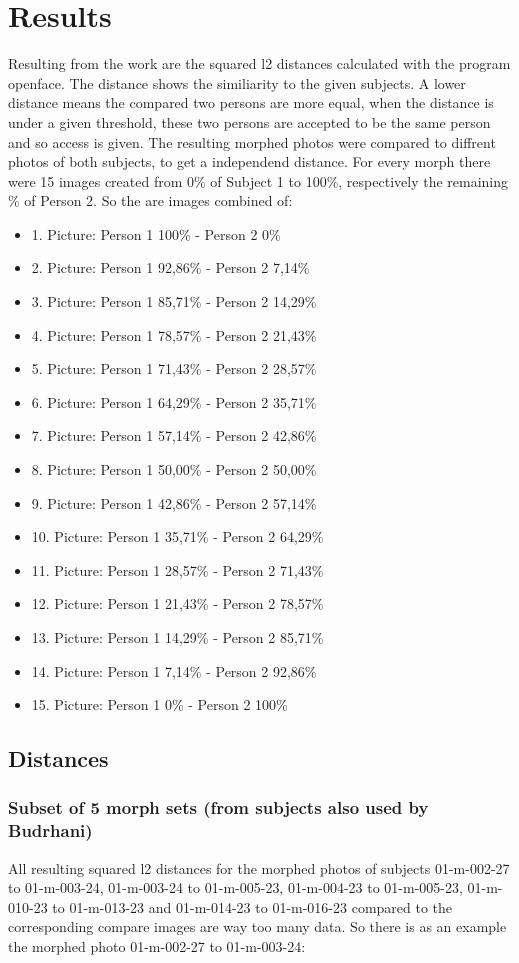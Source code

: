 \section{Results}
Resulting from the work are the squared l2 distances calculated with the program openface. The distance shows the similiarity to the given subjects. A lower distance means the compared two persons are more equal, when the distance is under a given threshold, these two persons are accepted to be the same person and so access is given. The resulting morphed photos were compared to diffrent photos of both subjects, to get a independend distance. For every morph there were 15 images created from 0\% of Subject 1 to 100\%, respectively the remaining \% of Person 2. So the are images combined of:
\begin{itemize}
\item 1. Picture: Person 1 100\% - Person 2 0\%
\item 2. Picture: Person 1 92,86\% - Person 2 7,14\%
\item 3. Picture: Person 1 85,71\% - Person 2 14,29\%
\item 4. Picture: Person 1 78,57\% - Person 2 21,43\%
\item 5. Picture: Person 1 71,43\% - Person 2 28,57\%
\item 6. Picture: Person 1 64,29\% - Person 2 35,71\%
\item 7. Picture: Person 1 57,14\% - Person 2 42,86\%
\item 8. Picture: Person 1 50,00\% - Person 2 50,00\%
\item 9. Picture: Person 1 42,86\% - Person 2 57,14\%
\item 10. Picture: Person 1 35,71\% - Person 2 64,29\%
\item 11. Picture: Person 1 28,57\% - Person 2 71,43\%
\item 12. Picture: Person 1 21,43\% - Person 2 78,57\%
\item 13. Picture: Person 1 14,29\% - Person 2 85,71\%
\item 14. Picture: Person 1 7,14\% - Person 2 92,86\%
\item 15. Picture: Person 1 0\% - Person 2 100\%
\end{itemize}

\subsection{Distances}
\subsubsection{Subset of 5 morph sets (from subjects also used by Budrhani)}
All resulting squared l2 distances for the morphed photos of subjects 01-m-002-27 to 01-m-003-24, 01-m-003-24 to 01-m-005-23, 01-m-004-23 to 01-m-005-23, 01-m-010-23 to 01-m-013-23 and 01-m-014-23 to 01-m-016-23 compared to the corresponding compare images are way too many data. So there is as an example the morphed photo 01-m-002-27 to 01-m-003-24:

